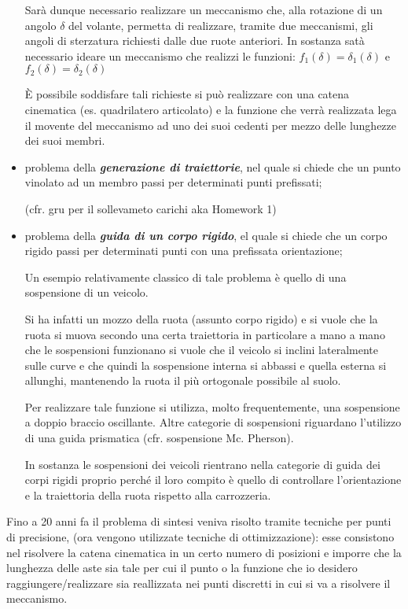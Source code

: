 \begin{itemize}
Sarà dunque necessario realizzare un meccanismo che, alla rotazione di un angolo $\delta$ del volante, permetta di realizzare, tramite due meccanismi, gli angoli di sterzatura richiesti dalle due ruote anteriori. In sostanza satà necessario ideare un  meccanismo che realizzi le funzioni: $f_1(\delta) = \delta_1 (\delta)$ e $f_2(\delta) = \delta_2 (\delta)$

È possibile soddisfare tali richieste si può realizzare con una catena cinematica (es. quadrilatero articolato) e la funzione che verrà realizzata lega il movente del meccanismo ad uno dei suoi cedenti per mezzo delle lunghezze dei suoi membri.

\item problema della {\bfseries \emph{generazione di traiettorie}}, nel quale si chiede che un punto vinolato ad un membro passi per determinati punti prefissati;

(cfr. gru per il sollevameto carichi aka Homework 1)
\item problema della {\bfseries \emph{guida di un corpo rigido}}, el quale si chiede che un corpo rigido passi per determinati punti con una prefissata orientazione;

Un esempio relativamente classico di tale problema è quello di una sospensione di un veicolo.

Si ha infatti un mozzo della ruota (assunto corpo rigido) e si vuole che la ruota si muova secondo una certa traiettoria in particolare a mano a mano che le sospensioni funzionano si vuole che il veicolo si inclini lateralmente sulle curve e che quindi la sospensione interna si abbassi e quella esterna si allunghi, mantenendo la ruota il più ortogonale possibile al suolo.

Per realizzare tale funzione si utilizza, molto frequentemente, una sospensione a doppio braccio oscillante. Altre categorie di sospensioni riguardano l'utilizzo di una guida prismatica (cfr. sospensione Mc. Pherson).

In sostanza le sospensioni dei veicoli rientrano nella categorie di guida dei corpi rigidi proprio perché il loro compito è quello di controllare l'orientazione e la traiettoria della ruota rispetto alla carrozzeria.
\end{itemize}

Fino a 20 anni fa il problema di sintesi veniva risolto tramite tecniche per punti di precisione, (ora vengono utilizzate tecniche di ottimizzazione): esse consistono nel risolvere la catena cinematica in un certo numero di posizioni e imporre che la lunghezza delle aste sia tale per cui il punto o la funzione che io desidero raggiungere/realizzare sia reallizzata nei punti discretti in cui si va a risolvere il meccanismo.

